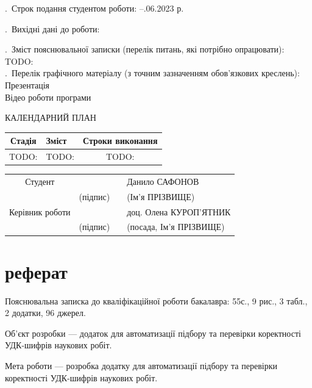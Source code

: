 \documentclass[14pt]{extarticle}
\let\oldsection\section
\renewcommand{\section}{\clearpage\oldsection}
\begin{document}
. Строк подання студентом роботи:
--.06.2023 р.

. Вихідні дані до роботи:

. Зміст пояснювальної записки (перелік питань, які потрібно опрацювати):\\
TODO:\\

. Перелік графічного матеріалу (з точним зазначенням обов’язкових креслень):\\
Презентація\\
Відео роботи програми\\

\newpage
\centerline{КАЛЕНДАРНИЙ ПЛАН}
\vspace{\baselineskip}

\noindent
\begin{tabularx}{\linewidth}{|c|X|c|}
  \hline
  Стадія & Зміст & Строки виконання \\
  \hline
  TODO:  & TODO: & TODO: \\
  \hline
\end{tabularx}

\vspace{\baselineskip}
\begin{flushright}
\begin{tabular}{clp{0.7cm}l}
  Студент         &                                      & & Данило САФОНОВ \\ \cline{2-2} \cline{4-4}
                  & \fontsize{10}{10}\selectfont(підпис) & & \fontsize{10}{10}\selectfont(Ім’я ПРІЗВИЩЕ) \\
  Керівник роботи &                                      & & доц. Олена КУРОП'ЯТНИК \\ \cline{2-2} \cline{4-4}
                  & \fontsize{10}{10}\selectfont(підпис) & & \fontsize{10}{10}\selectfont(посада, Ім’я ПРІЗВИЩЕ)\\
\end{tabular}
\end{flushright}

\section*{реферат}
Пояснювальна записка до кваліфікаційної роботи бакалавра:
55с., 9 рис., 3 табл., 2 додатки, 96 джерел.

Об’єкт розробки --- додаток для автоматизації підбору
та перевірки коректності УДК-шифрів наукових робіт.

Мета роботи --- розробка додатку для автоматизації підбору
та перевірки коректності УДК-шифрів наукових робіт.
\end{document}
